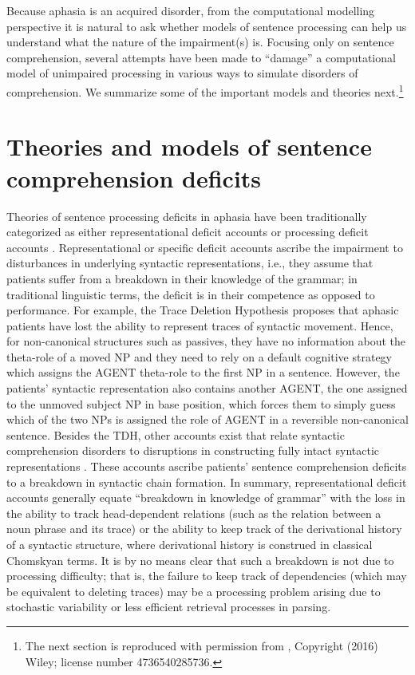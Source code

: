 \documentclass{cambridge7A}\usepackage[]{graphicx}\usepackage[]{color}
\begin{document}
Because aphasia is an acquired disorder, from the computational modelling perspective it is natural to ask whether models of sentence processing can help us understand what the nature of the impairment(s) is.
Focusing only on sentence comprehension, several attempts have been made to ``damage'' a computational model of unimpaired processing in various ways to simulate disorders of comprehension. We summarize some of the important models and theories next.\footnote{The next section is reproduced with permission from \cite{PatilEtAl2016}, Copyright (2016) Wiley; license number 4736540285736.}

\section{Theories and models of sentence comprehension deficits} \label{alternativeexplanations}

Theories of sentence processing deficits in aphasia have been traditionally categorized as either  representational deficit accounts or  processing deficit accounts \citep[for an overview, see][]{Caplan:2009}.
Representational or specific deficit accounts ascribe the impairment to disturbances in underlying syntactic representations, i.e., they assume that patients suffer from a breakdown in their knowledge of the grammar; in traditional linguistic terms, the deficit is in their competence as opposed to performance. 
For example, the  Trace Deletion Hypothesis \citep[TDH,][]{Grodzinsky:1995,Grodzinsky:2000,Grodzinsky:2006a} proposes that aphasic patients have lost the ability to represent traces of syntactic movement. Hence, for non-canonical structures such as passives, they have no information about the theta-role of a moved NP and they need to rely on a default cognitive strategy which assigns the AGENT theta-role to the first NP in a sentence. However, the patients' syntactic representation also contains another AGENT, the one assigned to the unmoved subject NP in base position, which forces them to simply guess which of the two NPs is assigned the role of AGENT in a reversible non-canonical sentence.
Besides the TDH, other accounts exist that relate syntactic comprehension disorders to disruptions in constructing fully intact syntactic representations \citep[for example,][]{Beretta:1998,Hickok:1995,Mauner:1993}. These accounts ascribe patients' sentence comprehension deficits to a breakdown in syntactic chain formation. 
In summary, representational deficit accounts generally equate ``breakdown in knowledge of grammar'' with the loss in the ability to track head-dependent relations (such as the relation between a noun phrase and its trace) or the ability to keep track of the derivational history of a syntactic structure, where derivational history is construed in classical Chomskyan terms. It is by no means clear that such a breakdown is not due to processing difficulty; that is, the failure to keep track of dependencies (which may be equivalent to deleting traces) may be a processing problem arising due to stochastic variability or less efficient retrieval processes in parsing.
\end{document}
